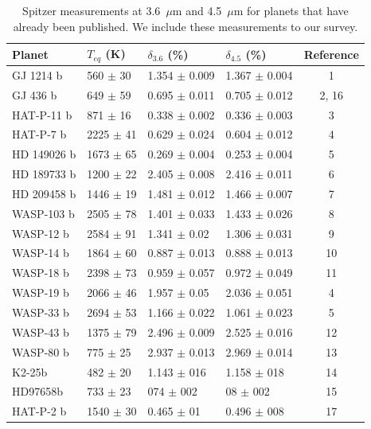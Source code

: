 \begin{table}
\caption{Spitzer measurements at 3.6~$\mu$m and 4.5~$\mu$m for planets that have already been published. We include these measurements to our survey.}
\label{P1:tab:littransits}
\centering
\begin{tabular}{llllc}
\hline\hline
Planet &    $T_{eq}$ (K) & $\delta_{3.6}$ (\%) & $\delta_{4.5}$ (\%) & Reference \\
\hline
GJ 1214 b   &   560 $\pm$ 30 &     1.354 $\pm$ 0.009 &     1.367 $\pm$ 0.004 & 1 \\
GJ 436 b    &   649 $\pm$ 59 &     0.695 $\pm$ 0.011 &     0.705 $\pm$ 0.012 & 2, 16 \\
HAT-P-11 b  &   871 $\pm$ 16 &     0.338 $\pm$ 0.002 &     0.336 $\pm$ 0.003 & 3 \\
HAT-P-7 b   &  2225 $\pm$ 41 &     0.629 $\pm$ 0.024 &     0.604 $\pm$ 0.012 & 4 \\
HD 149026 b &  1673 $\pm$ 65 &     0.269 $\pm$ 0.004 &     0.253 $\pm$ 0.004 & 5 \\
HD 189733 b &  1200 $\pm$ 22 &     2.405 $\pm$ 0.008 &     2.416 $\pm$ 0.011 & 6 \\
HD 209458 b &  1446 $\pm$ 19 &     1.481 $\pm$ 0.012 &     1.466 $\pm$ 0.007 & 7 \\
WASP-103 b  &  2505 $\pm$ 78 &     1.401 $\pm$ 0.033 &     1.433 $\pm$ 0.026 & 8 \\
WASP-12 b   &  2584 $\pm$ 91 &      1.341 $\pm$ 0.02 &     1.306 $\pm$ 0.031 & 9 \\
WASP-14 b   &  1864 $\pm$ 60 &     0.887 $\pm$ 0.013 &     0.888 $\pm$ 0.013 & 10 \\
WASP-18 b   &  2398 $\pm$ 73 &     0.959 $\pm$ 0.057 &     0.972 $\pm$ 0.049 & 11 \\
WASP-19 b   &  2066 $\pm$ 46 &      1.957 $\pm$ 0.05 &     2.036 $\pm$ 0.051 & 4 \\
WASP-33 b   &  2694 $\pm$ 53 &     1.166 $\pm$ 0.022 &     1.061 $\pm$ 0.023 & 5 \\
WASP-43 b   &  1375 $\pm$ 79 &     2.496 $\pm$ 0.009 &     2.525 $\pm$ 0.016 & 12 \\
WASP-80 b   &   775 $\pm$ 25 &     2.937 $\pm$ 0.013 &     2.969 $\pm$ 0.014 & 13 \\
K2-25b      &   482 $\pm$ 20 &     1.143 $\pm$ 016 &     1.158 $\pm$ 018 & 14   \\
HD97658b    &   733 $\pm$ 23 &     074 $\pm$ 002 &      08 $\pm$ 002 & 15 \\
HAT-P-2 b   &  1540 $\pm$ 30 &      0.465 $\pm$ 01 &     0.496 $\pm$ 008 & 17 \\
\hline
\end{tabular}



\end{table}

